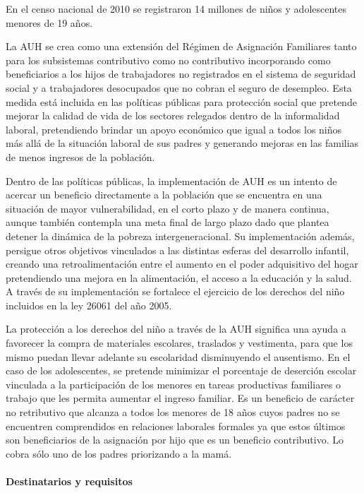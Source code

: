 \documentclass[
  12,
]{article}
\begin{document}
En el censo nacional de 2010 se registraron 14 millones de niños y
adolescentes menores de 19 años.

La AUH se crea como una extensión del Régimen de Asignación Familiares
tanto para los subsistemas contributivo como no contributivo
incorporando como beneficiarios a los hijos de trabajadores no
registrados en el sistema de seguridad social y a trabajadores
desocupados que no cobran el seguro de desempleo. Esta medida está
incluida en las políticas públicas para protección social que pretende
mejorar la calidad de vida de los sectores relegados dentro de la
informalidad laboral, pretendiendo brindar un apoyo económico que igual
a todos los niños más allá de la situación laboral de sus padres y
generando mejoras en las familias de menos ingresos de la población.

Dentro de las políticas públicas, la implementación de AUH es un intento
de acercar un beneficio directamente a la población que se encuentra en
una situación de mayor vulnerabilidad, en el corto plazo y de manera
continua, aunque también contempla una meta final de largo plazo dado
que plantea detener la dinámica de la pobreza intergeneracional. Su
implementación además, persigue otros objetivos vinculados a las
distintas esferas del desarrollo infantil, creando una retroalimentación
entre el aumento en el poder adquisitivo del hogar pretendiendo una
mejora en la alimentación, el acceso a la educación y la salud. A través
de su implementación se fortalece el ejercicio de los derechos del niño
incluidos en la ley 26061 del año 2005.

La protección a los derechos del niño a través de la AUH significa una
ayuda a favorecer la compra de materiales escolares, traslados y
vestimenta, para que los mismo puedan llevar adelante su escolaridad
disminuyendo el ausentismo. En el caso de los adolescentes, se pretende
minimizar el porcentaje de deserción escolar vinculada a la
participación de los menores en tareas productivas familiares o trabajo
que les permita aumentar el ingreso familiar. Es un beneficio de
carácter no retributivo que alcanza a todos los menores de 18 años cuyos
padres no se encuentren comprendidos en relaciones laborales formales ya
que estos últimos son beneficiarios de la asignación por hijo que es un
beneficio contributivo. Lo cobra sólo uno de los padres priorizando a la
mamá.

\hypertarget{destinatarios-y-requisitos}{%
\paragraph{Destinatarios y
requisitos}\label{destinatarios-y-requisitos}}
\end{document}
